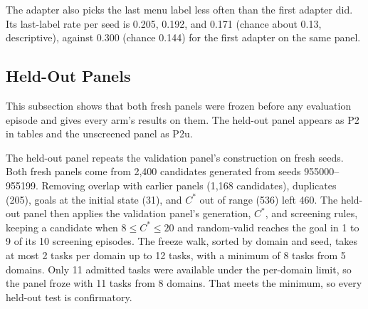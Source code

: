 The adapter also picks the last menu label less often than the first adapter did. Its last-label rate per seed is 0.205, 0.192, and 0.171 (chance about 0.13, descriptive), against 0.300 (chance 0.144) for the first adapter on the same panel.

\subsection{Held-Out Panels}
\label{app:results-panels}

This subsection shows that both fresh panels were frozen before any evaluation episode and gives every arm's results on them. The held-out panel appears as P2 in tables and the unscreened panel as P2u.

The held-out panel repeats the validation panel's construction on fresh seeds. Both fresh panels come from 2,400 candidates generated from seeds 955000--955199. Removing overlap with earlier panels (1,168 candidates), duplicates (205), goals at the initial state (31), and $C^*$ out of range (536) left 460. The held-out panel then applies the validation panel's generation, $C^*$, and screening rules, keeping a candidate when $8 \le C^* \le 20$ and random-valid reaches the goal in 1 to 9 of its 10 screening episodes. The freeze walk, sorted by domain and seed, takes at most 2 tasks per domain up to 12 tasks, with a minimum of 8 tasks from 5 domains. Only 11 admitted tasks were available under the per-domain limit, so the panel froze with 11 tasks from 8 domains. That meets the minimum, so every held-out test is confirmatory.


